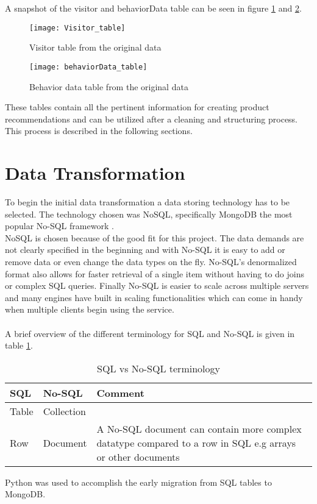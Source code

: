 A snapshot of the visitor and behaviorData table can be seen in figure \ref{visitorTable} and \ref{behaviorTable}.

\begin{figure}[H]
\texttt{[image: Visitor\_table]}
\caption{Visitor table from the original data}
\label{visitorTable}
\end{figure}
\begin{figure}[H]
\texttt{[image: behaviorData\_table]}
\caption{Behavior data table from the original data}
\label{behaviorTable}
\end{figure}

These tables contain all the pertinent information for creating product recommendations and can be utilized after a cleaning and structuring process. This process is described in the following sections.

\section{Data Transformation}
To begin the initial data transformation a data storing technology has to be selected. The technology chosen was \gls{NoSQL}, specifically \gls{MongoDB} the most popular No-SQL framework \cite{DBRankings}. \\
\gls{NoSQL} is chosen because of the good fit for this project. The data demands are not clearly specified in the beginning and with No-SQL it is easy to add or remove data or even change the data types on the fly. No-SQL's denormalized format also allows for faster retrieval of a single item without having to do joins or complex SQL queries. Finally No-SQL is easier to scale across multiple servers and many engines have built in scaling functionalities \cite{SQLvsNOSQL} which can come in handy when multiple clients begin using the service. \\\\

A brief overview of the different terminology for SQL and No-SQL is given in table \ref{sqlvsnosql_table}.
\begin{table}[H]
\centering
\caption{SQL vs No-SQL terminology}
\label{sqlvsnosql_table}
\begin{tabular}{|l|l|p{8cm}|}
\hline
\textbf{SQL}   & \textbf{No-SQL}     & \textbf{Comment}                                                                                                    \\ \hline
Table & Collection &                                                                                                            \\ \hline
Row   & Document   & A No-SQL document can contain more complex datatype compared to a row in SQL e.g arrays or other documents \\
\hline
\end{tabular}
\end{table}

Python was used to accomplish the early migration from SQL tables to MongoDB.  